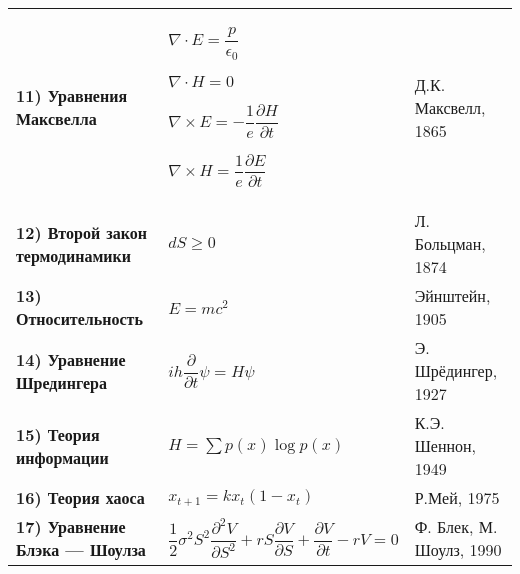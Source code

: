 \documentclass[10pt, a3paper]{scrartcl}
\begin{document}
\begin{tabular}{p{8cm}  p{7cm} p{10cm}}
      \textbf{11)   Уравнения Максвелла} &
      {
      	$\nabla \cdot E = \dfrac{p}{\epsilon_0} $  
      	
      	$ \nabla \cdot H = 0$
      	
      	$\nabla  \times E = - \dfrac{1}{e} \dfrac{\partial H}{\partial t} $
      	
      	$\nabla  \times H = \dfrac{1}{e} \dfrac{\partial E}{\partial t} $
      } &  {Д.К. Максвелл, 1865}\\
   
      \textbf{12)   Второй закон
      	термодинамики} &
      {$dS\ge 0$} &  {Л. Больцман, 1874}\\
  
      \textbf{13)   Относительность} &
      {$E=mc^2$} & {Эйнштейн, 1905} \\
  
      \textbf{14)   Уравнение
      	Шредингера} &
      {$ih \dfrac{\partial}{\partial t} \psi = H \psi$} & {Э. Шрёдингер, 1927} \\
   
      \textbf{15)   Теория информации} &
      {$H = \sum p(x) \log p(x)$} & {К.Э. Шеннон, 1949}\\
   
      \textbf{16)   Теория хаоса} &
      {$x_{t+1}=kx_{t}(1-x_{t})$}  & {Р.Мей, 1975} \\

      \textbf{17)   Уравнение
      	Блэка — Шоулза} &
      {$\dfrac{1}{2} \sigma^2 S^2 \dfrac{\partial^2 V}{\partial S^2} + rS \dfrac{\partial V}{\partial S} + \dfrac{\partial V}{\partial t} - rV = 0$} & {Ф. Блек, М. Шоулз, 1990}\\
\end{tabular} 
\end{document}
